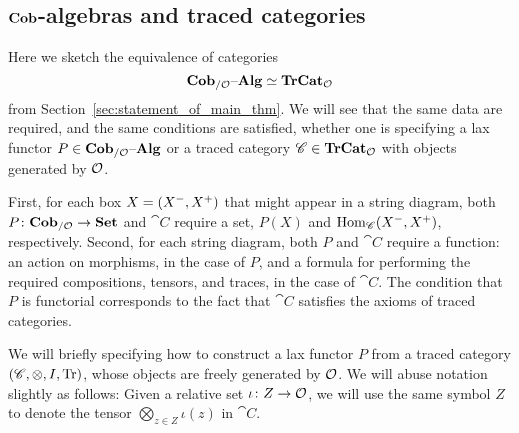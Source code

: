 \documentclass[12pt,oneside,article,draft]{memoir}
\begin{document}
\subsection{$\mathbf{Cob}$-algebras and traced categories}\label{subsec:cobalg_and_trCat}

Here we sketch the equivalence of categories 
$$\mathbf{Cob}_{/\mathcal{O}}{\text \textendash}\mathbf{Alg}\simeq\mathbf{TrCat}_{\mathcal{O}}$$
from Section~\ref{sec:statement_of_main_thm}. We will see that the same data are required, and the same conditions are
satisfied, whether one is specifying a lax functor $P\in\mathbf{Cob}_{/\mathcal{O}}{\text \textendash}\mathbf{Alg}$ or a traced category
$\mathscr{C}\in\mathbf{TrCat}_{\mathcal{O}}$ with objects generated by $\mathcal{O}$. 

First, for each box $X=(X^-,X^+)$ that might appear in a string diagram, both $P\colon\mathbf{Cob}_{/\mathcal{O}}\to\mathbf{Set}$ and
$\cat{C}$ require a set, $P(X)$ and $\operatorname{Hom}_{\mathscr{C}}(X^-,X^+)$, respectively.
Second, for each string diagram, both $P$ and $\cat{C}$ require a function: an action on morphisms,
in the case of $P$, and a formula for performing the required compositions, tensors, and traces, in
the case of $\cat{C}$. The condition that $P$ is functorial corresponds to the fact that $\cat{C}$
satisfies the axioms of traced categories. 

We will briefly specifying how to construct a lax functor $P$ from a traced category $(\mathscr{C},\otimes,I,\operatorname{Tr})$, whose objects are freely generated by $\mathcal{O}$. We will abuse notation slightly as follows: Given a relative set
$\iota\colon Z\to\mathcal{O}$, we will use the same symbol $Z$ to denote
the tensor $\bigotimes_{z\in Z}\iota(z)$ in $\cat{C}$. 
\end{document}
